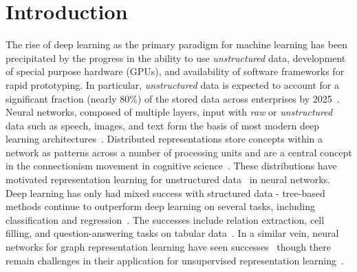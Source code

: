 
\chapter{Introduction}


The rise of deep learning as the primary paradigm for machine learning has been precipitated by the progress in the ability to use \textit{unstructured} data, development of special purpose hardware (GPUs), and availability of software frameworks for rapid prototyping.
In particular, \textit{unstructured} data is expected to account for a significant fraction (nearly 80\%) of the stored data across enterprises by 2025~\citep{rydning2018digitization}. 
Neural networks, composed of multiple layers, input with \textit{raw} or \textit{unstructured} data such as speech, images, and text form the basis of most modern deep learning architectures~\cite{lecun2015deep}.
Distributed representations store concepts within a network as patterns across a number of processing units and are a central concept in the connectionism movement in cognitive science~\citep{hinton1986distributed}.
These distributions have motivated representation learning for unstructured data~\citep{goodfellow2016deep,lecun2015deep} in neural networks.
Deep learning has only had mixed success with structured data - 
tree-based methods continue to outperform deep learning on several tasks, including classification and regression~\citep{shwartz2022tabular,grinsztajn2022tree}. 
The successes include relation extraction, cell filling, and question-answering tasks on tabular data~\cite{deng2022turl}. 
In a similar vein, neural networks for graph representation learning have seen successes~\cite{welling2016semi,velivckovic2018graph} though there remain challenges in their application for unsupervised representation learning~\citep{gurukar2022benchmarking}.

